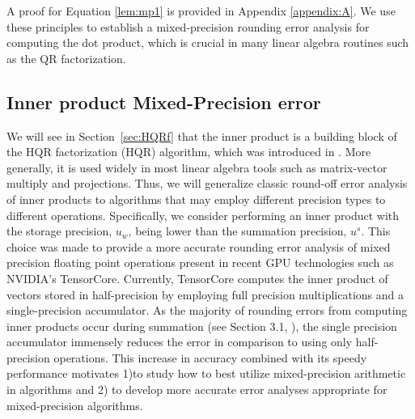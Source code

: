 A proof for Equation \ref{lem:mp1} is provided in Appendix \ref{appendix:A}.
We use these principles to establish a mixed-precision rounding error analysis for computing the dot product, which is crucial in many linear algebra routines such as the QR factorization.
\subsection{Inner product Mixed-Precision error}
\label{ssec:IP}
We will see in Section~\ref{sec:HQRf} that the inner product is a building block of the HQR factorization (HQR) algorithm, which was introduced in \cite{Householder1958}.
More generally, it is used widely in most linear algebra tools such as matrix-vector multiply and projections.
Thus, we will generalize classic round-off error analysis of inner products to algorithms that may employ different precision types to different operations. 
Specifically, we consider performing an inner product with the storage precision, $u_w$, being lower than the summation precision, $u^{s}$.
This choice was made to provide a more accurate rounding error analysis of mixed precision floating point operations present in recent GPU technologies such as NVIDIA's TensorCore. 
Currently, TensorCore computes the inner product of vectors stored in half-precision by employing full precision multiplications and a single-precision accumulator. 
As the majority of rounding errors from computing inner products occur during summation (see Section 3.1, \cite{Higham2002}), the single precision accumulator immensely reduces the error in comparison to using only half-precision operations.
This increase in accuracy combined with its speedy performance motivates 1)to study how to best utilize mixed-precision arithmetic in algorithms and 2) to develop more accurate error analyses appropriate for mixed-precision algorithms.


